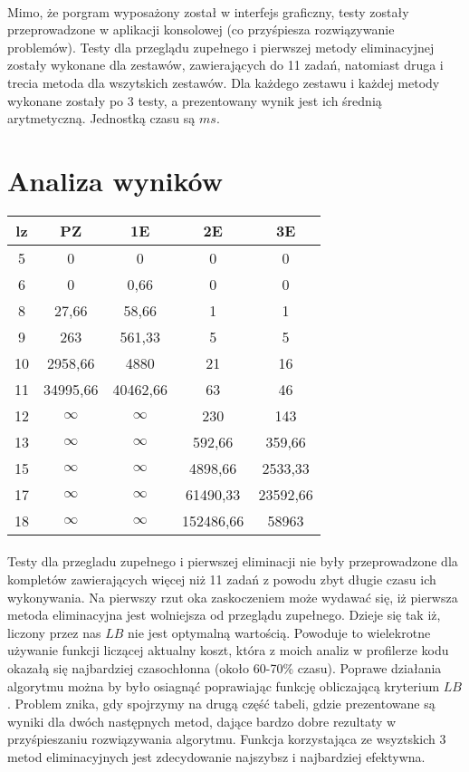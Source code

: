 \documentclass[wide,a4paper,titlepage,12pt] {article}
\begin{document}
\paragraph{}
Mimo, że porgram wyposażony został w interfejs graficzny, testy zostały przeprowadzone w aplikacji konsolowej (co przyśpiesza rozwiązywanie problemów). Testy dla przeglądu zupełnego i pierwszej metody eliminacyjnej zostały wykonane dla zestawów, zawierających do 11 zadań, natomiast druga i trecia metoda dla wszytskich zestawów. Dla każdego zestawu i każdej metody wykonane zostały po 3 testy, a prezentowany wynik jest ich średnią arytmetyczną. Jednostką czasu są $ms$. \newpage
\section{Analiza wyników}

\begin{center}
    \begin{tabular}{|c|c|c|c|c|}
    \hline
    lz & PZ & 1E & 2E & 3E \\ \hline
5 & 0 &0 &0 &0 \\ \hline
6 & 0 &0,66&0 &0\\ \hline
8 & 27,66 &58,66 &1 &1\\ \hline
9 & 263 &561,33 &5 &5\\ \hline
10 & 2958,66 &4880 &21 &16\\ \hline
11 & 34995,66 &40462,66 &63 &46\\ \hline
12 & $\infty$ &$\infty$ &230 &143\\ \hline
13 & $\infty$ &$\infty$ &592,66 &359,66\\ \hline
15 & $\infty$ &$\infty$ &4898,66 &2533,33\\ \hline
17 & $\infty$ &$\infty$ &61490,33&23592,66\\ \hline
18 & $\infty$ &$\infty$ &152486,66 &58963\\ \hline
   
    \end{tabular}

  \end{center}

\paragraph{}
Testy dla przegladu zupełnego i pierwszej eliminacji nie były przeprowadzone dla kompletów zawierających więcej niż 11 zadań z powodu zbyt długie czasu ich wykonywania. Na pierwszy rzut oka zaskoczeniem może wydawać się, iż pierwsza metoda eliminacyjna jest wolniejsza od przeglądu zupełnego. Dzieje się tak iż, liczony przez nas $LB$ nie jest optymalną wartością. Powoduje to wielekrotne używanie funkcji liczącej aktualny koszt, która z moich analiz w profilerze kodu okazałą się najbardziej czasochłonna (około 60-70\% czasu).  Poprawe działania algorytmu można by było osiagnąć poprawiając funkcję obliczającą kryterium $LB$. Problem znika, gdy spojrzymy na drugą część tabeli, gdzie prezentowane są wyniki dla dwóch następnych metod, dające bardzo dobre rezultaty w przyśpieszaniu rozwiązywania algorytmu. Funkcja korzystająca ze wsyztskich 3 metod eliminacyjnych jest zdecydowanie najszybsz i najbardziej efektywna.
\end{document}
